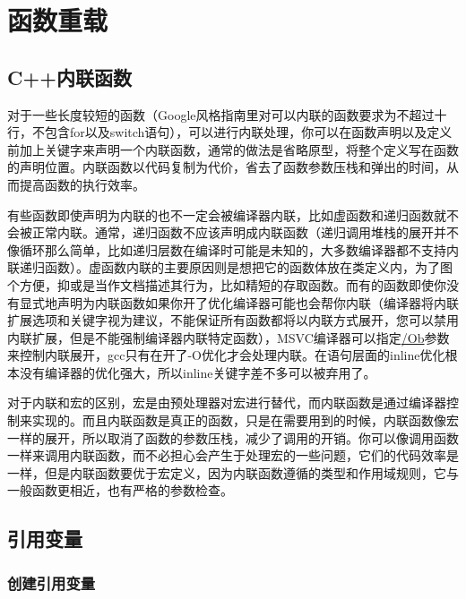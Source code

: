 
\chapter{函数重载}

\section{C++内联函数}

对于一些长度较短的函数（Google风格指南里对可以内联的函数要求为不超过十行，不包含for以及switch语句），可以进行内联处理，你可以在函数声明以及定义前加上关键字来声明一个内联函数，通常的做法是省略原型，将整个定义写在函数的声明位置。内联函数以代码复制为代价，省去了函数参数压栈和弹出的时间，从而提高函数的执行效率。

有些函数即使声明为内联的也不一定会被编译器内联，比如虚函数和递归函数就不会被正常内联。通常，递归函数不应该声明成内联函数（递归调用堆栈的展开并不像循环那么简单，比如递归层数在编译时可能是未知的，大多数编译器都不支持内联递归函数）。虚函数内联的主要原因则是想把它的函数体放在类定义内，为了图个方便，抑或是当作文档描述其行为，比如精短的存取函数。而有的函数即使你没有显式地声明为内联函数如果你开了优化编译器可能也会帮你内联（编译器将内联扩展选项和关键字视为建议，不能保证所有函数都将以内联方式展开，您可以禁用内联扩展，但是不能强制编译器内联特定函数），MSVC编译器可以指定\thinspace\href{https://docs.microsoft.com/zh-cn/cpp/build/reference/ob-inline-function-expansion?view=vs-2019}{/Ob}\thinspace 参数来控制内联展开，gcc只有在开了-O优化才会处理内联。在语句层面的inline优化根本没有编译器的优化强大，所以inline关键字差不多可以被弃用了。\dpar

对于内联和宏的区别，宏是由预处理器对宏进行替代，而内联函数是通过编译器控制来实现的。而且内联函数是真正的函数，只是在需要用到的时候，内联函数像宏一样的展开，所以取消了函数的参数压栈，减少了调用的开销。你可以像调用函数一样来调用内联函数，而不必担心会产生于处理宏的一些问题，它们的代码效率是一样，但是内联函数要优于宏定义，因为内联函数遵循的类型和作用域规则，它与一般函数更相近，也有严格的参数检查。

\section{引用变量}

\subsection{创建引用变量}

